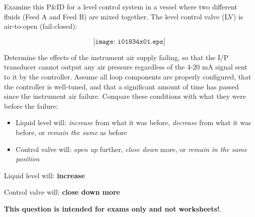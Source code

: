 

Examine this P\&ID for a level control system in a vessel where two different fluids (Feed A and Feed B) are mixed together.  The level control valve (LV) is air-to-open (fail-closed):

$$\texttt{[image: i01834x01.eps]}$$

Determine the effects of the instrument air supply failing, so that the I/P transducer cannot output any air pressure regardless of the 4-20 mA signal sent to it by the controller.  Assume all loop components are properly configured, that the controller is well-tuned, and that a significant amount of time has passed since the instrument air failure.  Compare these conditions with what they were before the failure:

\begin{itemize}
\item{} Liquid level will: {\it increase} from what it was before, {\it decrease} from what it was before, or {\it remain the same} as before
\vskip 10pt
\item{} Control valve will: {\it open up} further, {\it close down} more, or {\it remain in the same position} 
\end{itemize}







\item{} Liquid level will: {\bf increase}
\vskip 5pt
\item{} Control valve will: {\bf close down more}







{\bf This question is intended for exams only and not worksheets!}.



